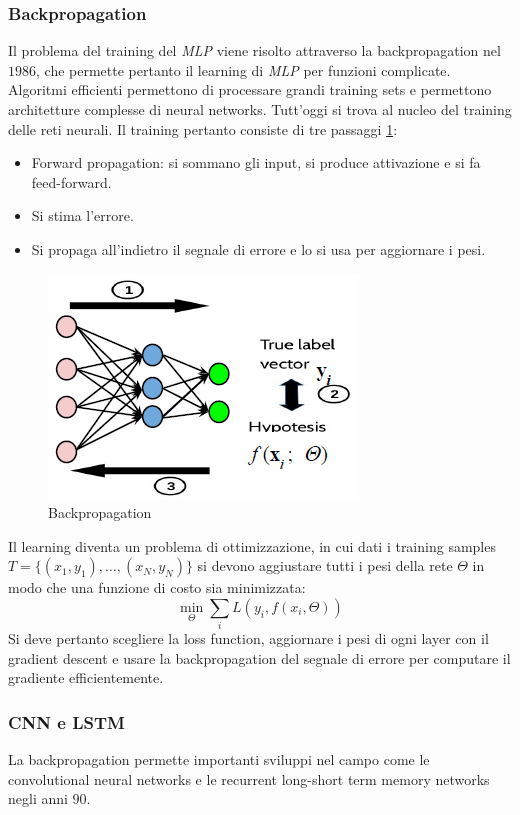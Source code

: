 		\subsubsection{Backpropagation}
		Il problema del training del \emph{MLP} viene risolto attraverso la backpropagation nel $1986$, che permette pertanto il learning di \emph{MLP} per funzioni complicate.
		Algoritmi efficienti permettono di processare grandi training sets e permettono architetture complesse di neural networks.
		Tutt'oggi si trova al nucleo del training delle reti neurali.
		Il training pertanto consiste di tre passaggi \ref{fig:chapter11-03}:
		\begin{multicols}{2}
			\begin{itemize}
				\item Forward propagation: si sommano gli input, si produce attivazione e si fa feed-forward.
				\item Si stima l'errore.
				\item Si propaga all'indietro il segnale di errore e lo si usa per aggiornare i pesi.
			\end{itemize}
		\end{multicols}
		
		\begin{figure}
			\centering
			\includegraphics[width=0.4\linewidth]{imgs/chapter11/img3}
			\caption{Backpropagation}
			\label{fig:chapter11-03}
		\end{figure}
		
		Il learning diventa un problema di ottimizzazione, in cui dati i training samples $T=\{(x_1,y_1),\dots,(x_N,y_N)\}$ si devono aggiustare tutti i pesi della rete $\Theta$ in modo che una funzione di costo sia minimizzata:
		$$\min_\Theta\sum\limits_i L(y_i, f(x_i,\Theta))$$
		Si deve pertanto scegliere la loss function, aggiornare i pesi di ogni layer con il gradient descent e usare la backpropagation del segnale di errore per computare il gradiente efficientemente.
		
		\subsubsection{CNN e LSTM}
		La backpropagation permette importanti sviluppi nel campo come le convolutional neural networks e le recurrent long-short term memory networks negli anni $90$.

